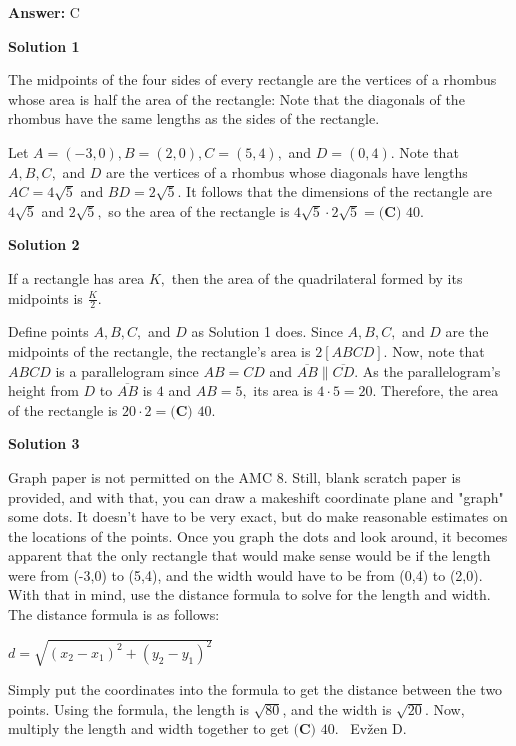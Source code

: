 \begin{enumerate}
 \textbf{Answer: }C



\textbf{Solution 1}

The midpoints of the four sides of every rectangle are the vertices of a rhombus whose area is half the area of the rectangle: Note that the diagonals of the rhombus have the same lengths as the sides of the rectangle.

 Let $A=(-3,0), B=(2,0), C=(5,4),$ and $D=(0,4).$ Note that $A,B,C,$ and $D$ are the vertices of a rhombus whose diagonals have lengths $AC=4\sqrt{5}$ and $BD=2\sqrt{5}.$ It follows that the dimensions of the rectangle are $4\sqrt{5}$ and $2\sqrt{5},$ so the area of the rectangle is $4\sqrt{5}\cdot2\sqrt{5}=\boxed{\textbf{(C) } 40}.$




\textbf{Solution 2}

If a rectangle has area $K,$ then the area of the quadrilateral formed by its midpoints is $\frac{K}{2}.$

 Define points $A,B,C,$ and $D$ as Solution 1 does. Since $A,B,C,$ and $D$ are the midpoints of the rectangle, the rectangle's area is $2[ABCD].$ Now, note that $ABCD$ is a parallelogram since $AB=CD$ and $\overline{AB}\parallel\overline{CD}.$ As the parallelogram's height from $D$ to $\overline{AB}$ is $4$ and $AB=5,$ its area is $4\cdot5=20.$ Therefore, the area of the rectangle is $20\cdot2=\boxed{\textbf{(C) } 40}.$




\textbf{Solution 3}

Graph paper is not permitted on the AMC 8. Still, blank scratch paper is provided, and with that, you can draw a makeshift coordinate plane and "graph" some dots. It doesn't have to be very exact, but do make reasonable estimates on the locations of the points. Once you graph the dots and look around, it becomes apparent that the only rectangle that would make sense would be if the length were from (-3,0) to (5,4), and the width would have to be from (0,4) to (2,0). With that in mind, use the distance formula to solve for the length and width. The distance formula is as follows:

 $d = \sqrt{(x_2 - x_1)^2 + (y_2 - y_1)^2}$

 
Simply put the coordinates into the formula to get the distance between the two points. Using the formula, the length is $\sqrt{80}$, and the width is $\sqrt{20}$. Now, multiply the length and width together to get $\boxed{\textbf{(C) } 40}.$ ~Evžen D.


\end{enumerate}
